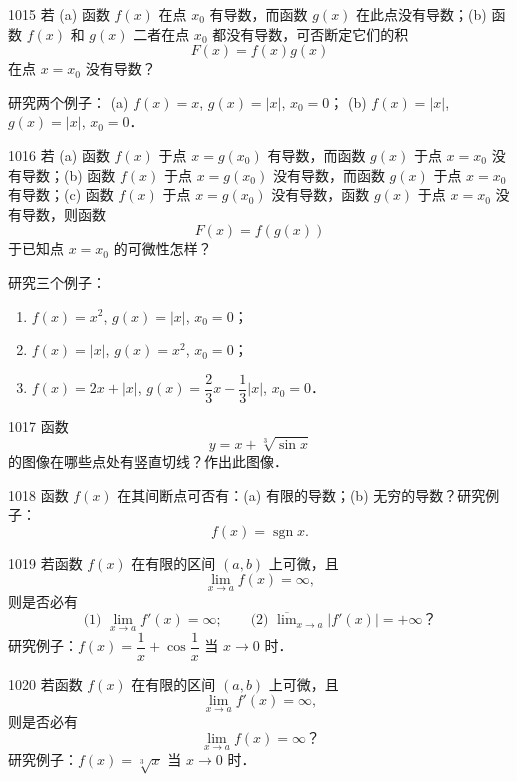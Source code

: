 \begin{prob}[M]{1015}
若 (a) 函数 $f(x)$ 在点 $x_0$ 有导数，而函数 $g(x)$ 在此点没有导数；(b) 函数 $f(x)$ 和 $g(x)$ 二者在点 $x_0$ 都没有导数，可否断定它们的积
\[
F(x) = f(x)g(x)
\]
在点 $x = x_0$ 没有导数？

研究两个例子：
(a) $f(x) = x$, $g(x) = |x|$, $x_0 = 0$； \qquad (b) $f(x) = |x|$, $g(x) = |x|$, $x_0 = 0$．
\end{prob}

\begin{prob}[L]{1016}
若 (a) 函数 $f(x)$ 于点 $x = g(x_0)$ 有导数，而函数 $g(x)$ 于点 $x = x_0$ 没有导数；(b) 函数 $f(x)$ 于点 $x = g(x_0)$ 没有导数，而函数 $g(x)$ 于点 $x = x_0$ 有导数；(c) 函数 $f(x)$ 于点 $x = g(x_0)$ 没有导数，函数 $g(x)$ 于点 $x = x_0$ 没有导数，则函数
\[
F(x) = f(g(x))
\]
于已知点 $x = x_0$ 的可微性怎样？

研究三个例子：
\begin{enumerate}[label=(\alph*), itemsep=2pt, topsep=3pt]
  \item $f(x) = x^2$, $g(x) = |x|$, $x_0 = 0$；
  \item $f(x) = |x|$, $g(x) = x^2$, $x_0 = 0$；
  \item $f(x) = 2x + |x|$, $g(x) = \dfrac{2}{3}x - \dfrac{1}{3}|x|$, $x_0 = 0$．
\end{enumerate}
\end{prob}

\begin{prob}[M]{1017}
函数
\[
y = x + \sqrt[3]{\sin x}
\]
的图像在哪些点处有竖直切线？作出此图像．
\end{prob}

\begin{prob}[M]{1018}
函数 $f(x)$ 在其间断点可否有：(a) 有限的导数；(b) 无穷的导数？研究例子：
\[
f(x) = \operatorname{sgn} x.
\]
\end{prob}

\begin{prob}[M]{1019}
若函数 $f(x)$ 在有限的区间 $(a, b)$ 上可微，且
\[
\lim_{x \to a} f(x) = \infty,
\]
则是否必有
\[
\text{(1) } \lim_{x \to a} f'(x) = \infty; \qquad \text{(2) } \overline{\lim}_{x \to a} |f'(x)| = +\infty\text{？}
\]
研究例子：$f(x) = \dfrac{1}{x} + \cos \dfrac{1}{x}$ 当 $x \to 0$ 时．
\end{prob}

\begin{prob}[M]{1020}
若函数 $f(x)$ 在有限的区间 $(a, b)$ 上可微，且
\[
\lim_{x \to a} f'(x) = \infty,
\]
则是否必有
\[
\lim_{x \to a} f(x) = \infty\text{？}
\]
研究例子：$f(x) = \sqrt[3]{x}$ 当 $x \to 0$ 时．
\end{prob}

